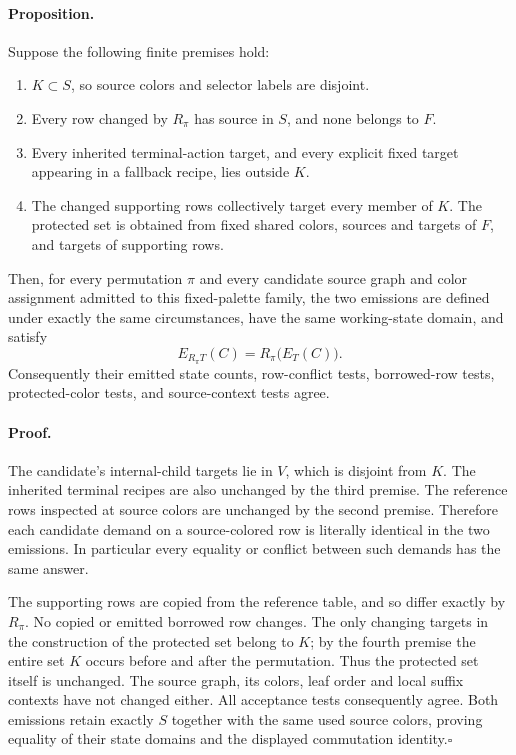 \paragraph{Proposition.}
Suppose the following finite premises hold:
\begin{enumerate}
\item $K\subset S$, so source colors and selector labels are disjoint.
\item Every row changed by $R_\pi$ has source in $S$, and none belongs to $F$.
\item Every inherited terminal-action target, and every explicit fixed
target appearing in a fallback recipe, lies outside $K$.
\item The changed supporting rows collectively target every member of $K$.
The protected set is obtained from fixed shared colors, sources and targets
of $F$, and targets of supporting rows.
\end{enumerate}
Then, for every permutation $\pi$ and every candidate source graph and color
assignment admitted to this fixed-palette family, the two emissions are
defined under exactly the same circumstances, have the same working-state
domain, and satisfy
\[
 E_{R_\pi T}(C)=R_\pi\bigl(E_T(C)\bigr).
\]
Consequently their emitted state counts, row-conflict tests, borrowed-row
tests, protected-color tests, and source-context tests agree.

\paragraph{Proof.}
The candidate's internal-child targets lie in $V$, which is disjoint from
$K$. The inherited terminal recipes are also unchanged by the third premise.
The reference rows inspected at source colors are unchanged by the second
premise. Therefore each candidate demand on a source-colored row is
literally identical in the two emissions. In particular every equality or
conflict between such demands has the same answer.

The supporting rows are copied from the reference table, and so differ
exactly by $R_\pi$. No copied or emitted borrowed row changes. The only
changing targets in the construction of the protected set belong to $K$;
by the fourth premise the entire set $K$ occurs before and after the
permutation. Thus the protected set itself is unchanged. The source graph,
its colors, leaf order and local suffix contexts have not changed either.
All acceptance tests consequently agree. Both emissions retain exactly
$S$ together with the same used source colors, proving equality of their
state domains and the displayed commutation identity.\hfill$\square$

